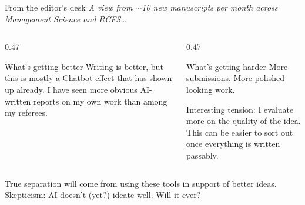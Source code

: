 \documentclass[aspectratio=169, 10pt]{beamer}
\begin{document}
\begin{frame}{From the editor's desk}
  \textit{A view from $\sim$10 new manuscripts per month across
  Management Science and RCFS\ldots}

  \vspace{0.5em}
  \begin{columns}[T]
    \begin{column}{0.47\textwidth}
      \begin{exampleblock}{What's getting better}
        \small Writing is better, but this is mostly a Chatbot effect that has shown up already.
        I have seen more obvious AI-written reports on my own work than among my referees.
      \end{exampleblock}
    \end{column}
    \begin{column}{0.47\textwidth}
      \begin{alertblock}{What's getting harder}
        \small More submissions. More polished-looking work.
       
       Interesting tension: I evaluate more on the quality of the idea. This can be easier to sort out once everything is written passably. 
      \end{alertblock}
    \end{column}
  \end{columns}

  \vspace{0.5em}
  \begin{findingbox}
    True separation will come from using these tools in support of better ideas.  \\
    Skepticism: AI doesn't (yet?) ideate well.  Will it ever?
  \end{findingbox}
\end{frame}
\end{document}
